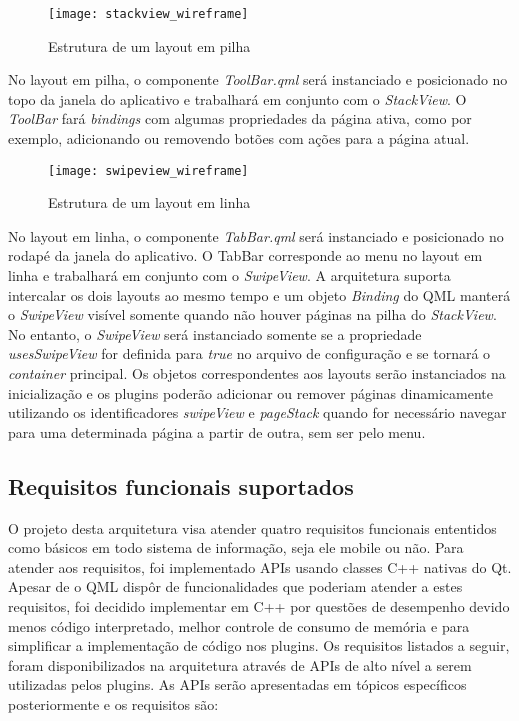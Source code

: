 \begin{figure}[H]
	\texttt{[image: stackview\_wireframe]}
	\centering
	\caption{Estrutura de um layout em pilha}
\end{figure}

No layout em pilha, o componente \textit{ToolBar.qml} será instanciado e posicionado no topo da janela do aplicativo e trabalhará em conjunto com o \textit{StackView}. O \textit{ToolBar} fará \textit{bindings} com algumas propriedades da página ativa, como por exemplo, adicionando ou removendo botões com ações para a página atual.

\begin{figure}[H]
	\texttt{[image: swipeview\_wireframe]}
	\centering
	\caption{Estrutura de um layout em linha}
\end{figure}

No layout em linha, o componente \textit{TabBar.qml} será instanciado e posicionado no rodapé da janela do aplicativo. O TabBar corresponde ao menu no layout em linha e trabalhará em conjunto com o \textit{SwipeView}. A arquitetura suporta intercalar os dois layouts ao mesmo tempo e um objeto \textit{Binding} do QML manterá o \textit{SwipeView} visível somente quando não houver páginas na pilha do \textit{StackView}. No entanto, o \textit{SwipeView} será instanciado somente se a propriedade \textit{usesSwipeView} for definida para \textit{true} no arquivo de configuração e se tornará o \textit{container} principal. Os objetos correspondentes aos layouts serão instanciados na inicialização e os plugins poderão adicionar ou remover páginas dinamicamente utilizando os identificadores \textit{swipeView} e \textit{pageStack} quando for necessário navegar para uma determinada página a partir de outra, sem ser pelo menu.\par


\subsection{Requisitos funcionais suportados}
O projeto desta arquitetura visa atender quatro requisitos funcionais ententidos como básicos em todo sistema de informação, seja ele mobile ou não. Para atender aos requisitos, foi implementado APIs usando classes C++ nativas do Qt. Apesar de o QML dispôr de funcionalidades que poderiam atender a estes requisitos, foi decidido implementar em C++ por questões de desempenho devido menos código interpretado, melhor controle de consumo de memória e para simplificar a implementação de código nos plugins. Os requisitos listados a seguir, foram disponibilizados na arquitetura através de APIs de alto nível a serem utilizadas pelos plugins. As APIs serão apresentadas em tópicos específicos posteriormente e os requisitos são:

